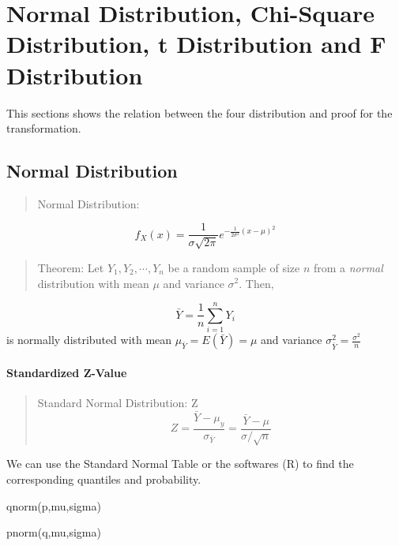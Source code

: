 \documentclass[
  letterpaper,
  DIV=11,
  numbers=noendperiod]{scrreprt}
\newenvironment{Shaded}{\begin{snugshade}}{\end{snugshade}}
\newcommand{\FunctionTok}[1]{\textcolor[rgb]{0.28,0.35,0.67}{#1}}
\newcommand{\NormalTok}[1]{\textcolor[rgb]{0.00,0.23,0.31}{#1}}
\theoremstyle{plain}
\theoremstyle{remark}
\begin{document}

\hypertarget{normal-distribution-chi-square-distribution-t-distribution-and-f-distribution}{%
\chapter{Normal Distribution, Chi-Square Distribution, t Distribution
and F
Distribution}\label{normal-distribution-chi-square-distribution-t-distribution-and-f-distribution}}

This sections shows the relation between the four distribution and proof
for the transformation.

\hypertarget{normal-distribution}{%
\section{Normal Distribution}\label{normal-distribution}}

\begin{quote}
Normal Distribution:
\end{quote}

\[
f_X(x)=\frac{1}{\sigma\sqrt{2\pi}}e^{-\frac{1}{2\sigma^2}(x-\mu)^2}
\]

\begin{quote}
Theorem: Let \(Y_1, Y_2, \cdots, Y_n\) be a random sample of size \(n\)
from a \emph{normal} distribution with mean \(\mu\) and variance
\(\sigma^2\). Then,
\end{quote}

\[
\bar{Y}=\frac{1}{n}\sum_{i=1}^n Y_i
\] is normally distributed with mean \(\mu_{\bar{Y}}=E(\bar{Y})=\mu\)
and variance \(\sigma^2_{\bar{Y}}=\frac{\sigma^2}{n}\)

\hypertarget{standardized-z-value}{%
\subsubsection{Standardized Z-Value}\label{standardized-z-value}}

\begin{quote}
Standard Normal Distribution: Z \[
Z=\frac{\bar{Y}-\mu_{y}}{\sigma_{\bar{Y}}}=\frac{\bar{Y}-\mu}{\sigma/\sqrt{n}}
\]
\end{quote}

We can use the Standard Normal Table or the softwares (R) to find the
corresponding quantiles and probability.

\begin{Shaded}
\begin{Highlighting}[]
\FunctionTok{qnorm}\NormalTok{(p,mu,sigma)}

\FunctionTok{pnorm}\NormalTok{(q,mu,sigma)}
\end{Highlighting}
\end{Shaded}
\end{document}
